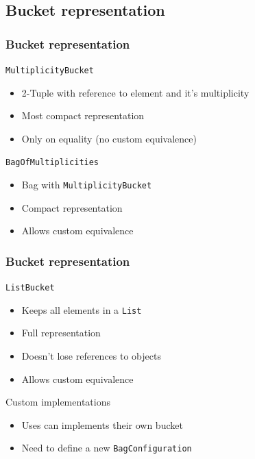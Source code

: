 \documentclass{beamer}
\begin{document}
\subsection{Bucket representation} 

\begin{frame}[fragile]
	\frametitle{Bucket representation}
	\begin{block}{\texttt{MultiplicityBucket}}
		\begin{itemize}
			\item 2-Tuple with reference to element and it's multiplicity
			\item Most compact representation
			\item Only on equality (no custom equivalence)
		\end{itemize}
	\end{block}
	\begin{block}{\texttt{BagOfMultiplicities}}
		\begin{itemize}
			\item Bag with \texttt{MultiplicityBucket}
			\item Compact representation
			\item Allows custom equivalence
		\end{itemize}
	\end{block}
\end{frame}

\begin{frame}[fragile]
	\frametitle{Bucket representation}
	\begin{block}{\texttt{ListBucket}}
		\begin{itemize}
			\item Keeps all elements in a \texttt{List}
			\item Full representation
			\item Doesn't lose references to objects
			\item Allows custom equivalence
		\end{itemize}
	\end{block}
	
	\begin{block}{Custom implementations}
		\begin{itemize}
			\item Uses can implements their own bucket
			\item Need to define a new \texttt{BagConfiguration}
		\end{itemize}
	\end{block}
\end{frame}
\end{document}
